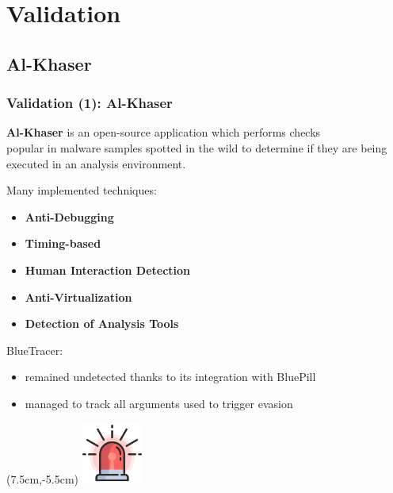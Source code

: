 \documentclass[compress]{beamer}
\begin{document}
\section{Validation}

\subsection{Al-Khaser}
\begin{frame}
    \frametitle{Validation (1): Al-Khaser}
    \begin{beamerboxesrounded}[shadow=true]{}
	\textbf{Al-Khaser} is an open-source application which performs checks \\ popular in malware samples spotted in the wild to determine if they are being
executed in an analysis environment.
\end{beamerboxesrounded}
\medskip
Many implemented techniques:
\begin{itemize}
\item \textbf{Anti-Debugging}
\item \textbf{Timing-based}
\item \textbf{Human Interaction Detection}
\item \textbf{Anti-Virtualization}
\item \textbf{Detection of Analysis Tools}
\end{itemize}
\medskip
\begin{beamerboxesrounded}[shadow=true]{}
BlueTracer: 
\begin{itemize}
\item remained undetected thanks to its integration with BluePill
\item managed to track all arguments used to trigger evasion
\end{itemize}
\end{beamerboxesrounded}

    \begin{textblock*}{3cm}(7.5cm,-5.5cm)
   \includegraphics[width=2cm]{image/lights.png}%
	\end{textblock*}

\end{frame}
\end{document}
